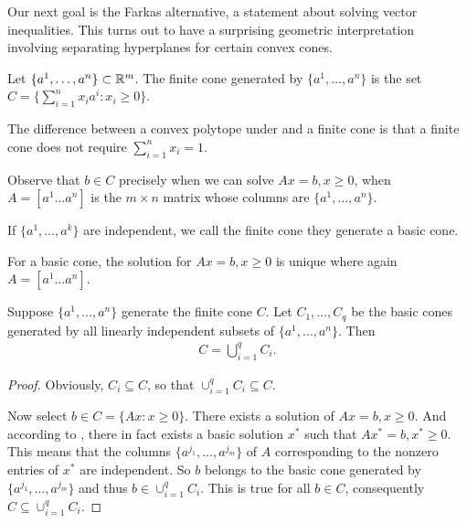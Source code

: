 Our next goal is the Farkas alternative, a statement about solving vector inequalities.
This turns out to have a surprising geometric interpretation involving separating hyperplanes for certain convex cones.

\begin{definition}
Let $\{ a^1, \dots, a^n \} \subset \mathbb{R}^m$.
The finite cone generated by $\{ a^1, \dots, a^n \}$ is the set $C = \{ \sum _{i=1}^{n} x_i a^i : x_i \ge 0 \}$.
\end{definition}

The difference between a convex polytope under  and a finite cone is that a finite cone does not require $\sum_{i=1}^{n} x_i = 1$. 

Observe that $b \in C$ precisely when we can solve $Ax =b, x \ge 0$, when $A = [a^1 \dots a^n]$ is the $m \times n$ matrix whose columns are $\{ a^1, \dots, a^n \}$.

\begin{definition}
If $\{ a^1, \dots, a^k \}$ are independent, we call the finite cone they generate a basic cone.
\end{definition}

For a basic cone, the solution for $Ax = b, x \ge 0$ is unique where again $A = [a^1 \dots a^n]$.

\begin{lemma}
Suppose $\{ a^1, \dots, a^n \}$ generate the finite cone $C$. 
Let $C_1, \dots, C_q$ be the basic cones generated by all linearly independent subsets of $\{ a^1, \dots, a^n \}$.
Then 
\begin{align}
C = \bigcup _{i=1} ^{q} C_i.
\end{align}
\end{lemma}

\begin{proof}
Obviously, $C_i \subseteq C$, so that $\cup_{i=1}^{q} C_i \subseteq C$.

Now select $b \in C = \{ A x : x \ge 0 \}$. 
There exists a solution of $A x = b, x \ge 0$.
And according to , there in fact exists a basic solution $x^*$ such that $A x^* = b, x^* \ge 0$.
This means that the columns $\{a^{j_1}, \dots, a^{j_m} \}$ of $A$ corresponding to the nonzero entries of $x^*$ are independent. 
So $b$ belongs to the basic cone generated by $\{a^{j_1}, \dots, a^{j_m} \}$ and thus $b \in \cup_{i=1}^{q} C_i$.
This is true for all $b \in C$, consequently $C \subseteq \cup_{i=1}^{q} C_i$.
\end{proof}

